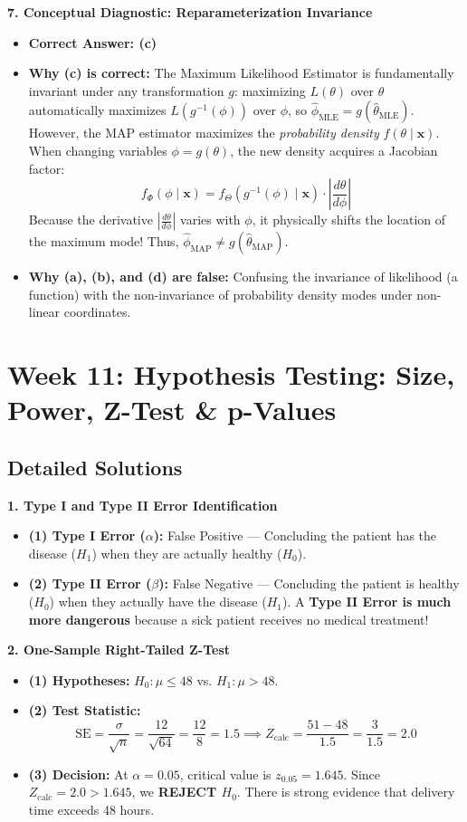 \textbf{7. Conceptual Diagnostic: Reparameterization Invariance}
\begin{itemize}
    \item \textbf{Correct Answer: (c)}
    \item \textbf{Why (c) is correct:} The Maximum Likelihood Estimator is fundamentally invariant under any transformation $g$: maximizing $L(\theta)$ over $\theta$ automatically maximizes $L(g^{-1}(\phi))$ over $\phi$, so $\hat{\phi}_{\text{MLE}} = g(\hat{\theta}_{\text{MLE}})$. 
    However, the MAP estimator maximizes the \emph{probability density} $f(\theta \mid \mathbf{x})$. When changing variables $\phi = g(\theta)$, the new density acquires a Jacobian factor:
    $$f_\Phi(\phi \mid \mathbf{x}) = f_\Theta(g^{-1}(\phi) \mid \mathbf{x}) \cdot \left| \frac{d\theta}{d\phi} \right|$$
    Because the derivative $\left|\frac{d\theta}{d\phi}\right|$ varies with $\phi$, it physically shifts the location of the maximum mode! Thus, $\hat{\phi}_{\text{MAP}} \neq g(\hat{\theta}_{\text{MAP}})$.
    \item \textbf{Why (a), (b), and (d) are false:} Confusing the invariance of likelihood (a function) with the non-invariance of probability density modes under non-linear coordinates.
\end{itemize}

\section*{Week 11: Hypothesis Testing: Size, Power, Z-Test \& p-Values}

\subsection*{Detailed Solutions}

\textbf{1. Type I and Type II Error Identification}
\begin{itemize}
    \item \textbf{(1) Type I Error ($\alpha$):} False Positive — Concluding the patient has the disease ($H_1$) when they are actually healthy ($H_0$).
    \item \textbf{(2) Type II Error ($\beta$):} False Negative — Concluding the patient is healthy ($H_0$) when they actually have the disease ($H_1$). A \textbf{Type II Error is much more dangerous} because a sick patient receives no medical treatment!
\end{itemize}

\textbf{2. One-Sample Right-Tailed Z-Test}
\begin{itemize}
    \item \textbf{(1) Hypotheses:} $H_0: \mu \le 48$ vs. $H_1: \mu > 48$.
    \item \textbf{(2) Test Statistic:}
    $$\text{SE} = \frac{\sigma}{\sqrt{n}} = \frac{12}{\sqrt{64}} = \frac{12}{8} = 1.5 \implies Z_{\text{calc}} = \frac{51 - 48}{1.5} = \frac{3}{1.5} = \mathbf{2.0}$$
    \item \textbf{(3) Decision:} At $\alpha = 0.05$, critical value is $z_{0.05} = 1.645$. Since $Z_{\text{calc}} = 2.0 > 1.645$, we \textbf{REJECT $H_0$}. There is strong evidence that delivery time exceeds 48 hours.
\end{itemize}

